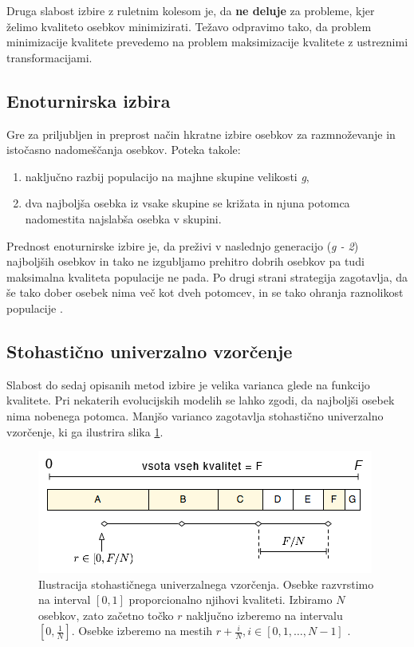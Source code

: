 \documentclass[a4paper, 12pt]{book}
\begin{document}
Druga slabost izbire z ruletnim kolesom je, da \textbf{ne deluje} za probleme, kjer \v zelimo kvaliteto osebkov minimizirati. Te\v zavo odpravimo tako, da problem minimizacije kvalitete prevedemo na problem maksimizacije kvalitete z ustreznimi transformacijami.

\subsection{Enoturnirska izbira}
Gre za priljubljen in preprost na\v cin hkratne izbire osebkov za razmno\v zevanje in isto\v casno nadome\v s\v canja osebkov. Poteka takole:
\begin{enumerate}
\item naklju\v cno razbij populacijo na majhne skupine velikosti \textit{g},
\item dva najbolj\v sa osebka iz vsake skupine se kri\v zata in njuna potomca nadomestita najslab\v sa osebka v skupini.
\end{enumerate}

Prednost enoturnirske izbire je, da pre\v zivi v naslednjo generacijo (\textit{g - 2}) najbolj\v sih osebkov in tako ne izgubljamo prehitro dobrih osebkov pa tudi maksimalna kvaliteta populacije ne pada. Po drugi strani strategija zagotavlja, da \v se tako dober osebek nima ve\v c kot dveh potomcev, in se tako ohranja raznolikost populacije
\cite{inteligentni sistemi}.

\subsection{Stohasti\v cno univerzalno vzor\v cenje}
Slabost do sedaj opisanih metod izbire je velika varianca glede na funkcijo kvalitete. Pri nekaterih evolucijskih modelih se lahko zgodi, da najbolj\v si osebek nima nobenega potomca. Manj\v so varianco zagotavlja stohasti\v cno univerzalno vzor\v cenje, ki ga ilustrira slika \ref{fig:stohasticno univerzalno vzorcenje}.

\begin{figure}
\begin{center}
\includegraphics[scale=0.70]{stohasticno_univerzalno_vzorcenje.png}
\end{center}
\caption{Ilustracija stohasti\v cnega univerzalnega vzor\v cenja. Osebke razvrstimo na interval $[0, 1]$ proporcionalno njihovi kvaliteti. Izbiramo $N$ osebkov, zato za\v cetno to\v cko $r$ naklju\v cno izberemo na intervalu $[0, \frac{1}{N}]$. Osebke izberemo na mestih $r + \frac{i}{N}, i \in [0, 1, \dots, N-1]$ \cite{inteligentni sistemi}.}
\label{fig:stohasticno univerzalno vzorcenje}
\end{figure}
\end{document}
